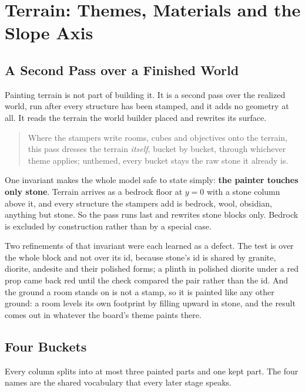 \chapter{Terrain: Themes, Materials and the Slope Axis}
\label{ch:terrain}

\section{A Second Pass over a Finished World}

Painting terrain is not part of building it. It is a second pass over the realized
world, run after every structure has been stamped, and it adds no geometry at all.
It reads the terrain the world builder placed and rewrites its surface.

\begin{quote}
Where the stampers write rooms, cubes and objectives onto the terrain, this pass
dresses the terrain \emph{itself}, bucket by bucket, through whichever theme
applies; unthemed, every bucket stays the raw stone it already is.
\end{quote}

One invariant makes the whole model safe to state simply: \textbf{the painter
touches only stone}. Terrain arrives as a bedrock floor at $y=0$ with a stone
column above it, and every structure the stampers add is bedrock, wool, obsidian,
anything but stone. So the pass runs last and rewrites stone blocks only. Bedrock
is excluded by construction rather than by a special case.

Two refinements of that invariant were each learned as a defect. The test is over
the whole block and not over its id, because stone's id is shared by granite,
diorite, andesite and their polished forms; a plinth in polished diorite under a
red prop came back red until the check compared the pair rather than the id. And
the ground a room stands on is not a stamp, so it is painted like any other ground:
a room levels its own footprint by filling upward in stone, and the result comes
out in whatever the board's theme paints there.

\section{Four Buckets}

Every column splits into at most three painted parts and one kept part. The four
names are the shared vocabulary that every later stage speaks.

